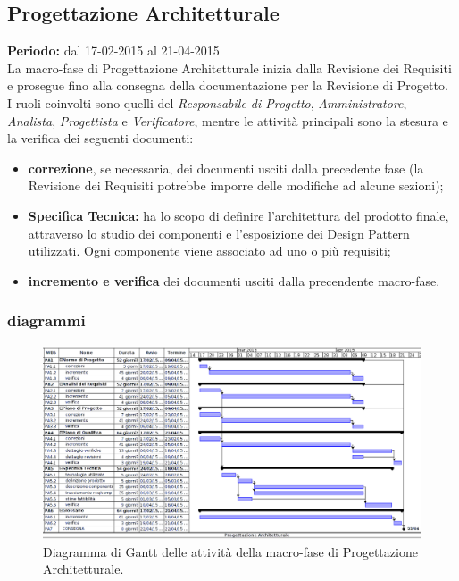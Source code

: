 \subsection{Progettazione Architetturale}
\textbf{Periodo:} dal 17-02-2015 al 21-04-2015 \\
La macro-fase di Progettazione Architetturale inizia dalla Revisione dei Requisiti e prosegue fino alla consegna della documentazione per la Revisione di Progetto. \\
I ruoli coinvolti sono quelli del \textit{Responsabile di Progetto}, \textit{Amministratore}, \textit{Analista}, \textit{Progettista} e \textit{Verificatore}, mentre le attività principali sono la stesura e la verifica dei seguenti documenti:

\begin{itemize}
\item \textbf{correzione}, se necessaria, dei documenti usciti dalla precedente fase (la Revisione dei Requisiti potrebbe imporre delle modifiche ad alcune sezioni);
\item \textbf{Specifica Tecnica:} ha lo scopo di definire l'architettura del prodotto finale,  attraverso lo studio dei componenti e l'esposizione dei Design Pattern utilizzati. Ogni componente viene associato ad uno o più requisiti;
\item \textbf{incremento e verifica} dei documenti usciti dalla precendente macro-fase.
\end{itemize}

\newpage
\subsubsection{diagrammi}

\begin{figure}[h]
\begin{center}
\includegraphics[width=\textwidth, height=\textheight, keepaspectratio]{img/progarc-gantt.png}
\caption{Diagramma di Gantt delle attività della macro-fase di Progettazione Architetturale.}
\end{center}
\end{figure}
\clearpage

